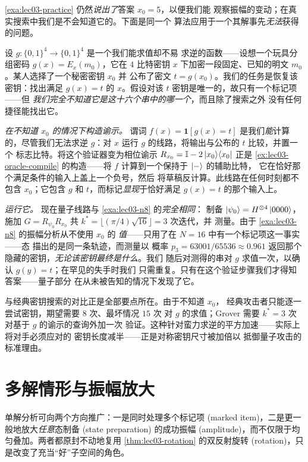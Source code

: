\begin{example}
\label{exa:lec03-unknown}
\cref{exa:lec03-practice} 仍然\emph{说出了}答案 $x_0=5$，以便我们能
观察振幅的变动；在真实搜索中我们是不会知道它的。下面是同一个
算法应用于一个其解事先\emph{无法}获得的问题。

设 $g:\{0,1\}^{4}\to\{0,1\}^{4}$ 是一个我们能求值却不易
求逆的函数——设想一个玩具分组密码 $g(x)=E_x(m_0)$，它在
$4$ 比特密钥 $x$ 下加密一段固定、已知的明文 $m_0$。某人选择了一个秘密密钥 $x_0$ 并
公布了密文 $t=g(x_0)$。我们的任务是恢复该密钥：找出满足
$g(x)=t$ 的 $x$。假设对该 $t$ 密钥是唯一的，故只有一个标记项——但
\emph{我们完全不知道它是这十六个串中的哪一个}，而且除了搜索之外
没有任何捷径能找出它。

\emph{在不知道 $x_0$ 的情况下构造谕示。} 谓词
$f(x)=\mathbf 1[g(x)=t]$ 是我们\emph{能}计算的，尽管我们无法求逆
$g$：对 $x$ 运行 $g$ 的线路，将输出与公布的 $t$ 比较，并置一个
标志比特。将这个验证器变为相位谕示 $R_{x_0}=\mathbb{I}-2\ket{x_0}\!\bra{x_0}$ 正是
\cref{ex:lec03-oracle-compile} 的构造——将 $f$ 计算到一个保持于 $\ket-$ 的辅助比特，
它在恰好那个满足条件的输入上盖上一个负号，然后
将草稿反计算。此线路在任何时刻都不包含 $x_0$；它包含 $g$ 和
$t$，而标记\emph{显现}于恰好满足 $g(x)=t$ 的那个输入上。

\emph{运行它。} 现在量子线路与 \cref{exa:lec03-n8} 的\emph{完全相同}：
制备 $\ket{\psi_0}=H^{\otimes4}\ket{0000}$，施加
$G=R_{\psi_0}R_{x_0}$ 共 $k^{\ast}=\lfloor(\pi/4)\sqrt{16}\rfloor=3$ 次迭代，并
测量。由于 \cref{exa:lec03-n8} 的振幅分析从不使用 $x_0$ 的
\emph{值}——只用了在 $N=16$ 中有一个标记项这一事实——态
描出的是同一条轨迹，而测量以
概率 $p_3=63001/65536\approx0.961$ 返回那个隐藏的密钥，\emph{无论该密钥最终是什么}。我们
随后对测得的串对 $g$ 求值一次，以确认 $g(y)=t$；在罕见的失手时我们
只需重复。只有在这个验证步骤我们才得知答案——量子部分
在从未被告知的情况下发现了它。

与经典密钥搜索的对比正是全部要点所在。由于不知道 $x_0$，
经典攻击者只能逐一尝试密钥，期望需要 $8$ 次、最坏情况 $15$ 次
对 $g$ 的求值；Grover 需要 $k^{\ast}=3$ 次对基于 $g$ 的谕示的查询外加一次
验证。这种针对蛮力求逆的平方加速——实际上将对手必须应对的
密钥长度减半——正是对称密钥尺寸被加倍以
抵御量子攻击的标准理由。
\end{example}
\section{多解情形与振幅放大}
\label{sec:lec03-4}

单解分析可向两个方向推广：一是同时处理多个标记项 (marked item)，二是更一般地放大\emph{任意}态制备 (state preparation) 的成功振幅 (amplitude)，而不仅限于均匀叠加。两者都原封不动地复用 \cref{thm:lec03-rotation} 的双反射旋转 (rotation)，只是改变了充当“好”子空间的角色。

